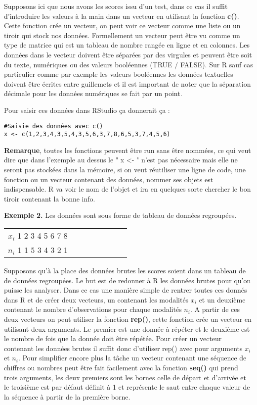 \documentclass{report}
\begin{document}
Supposons ici que nous avons les scores issu d'un test, dans ce cas il suffit d'introduire les valeurs à la main dans un vecteur en utilisant la fonction \textbf{c()}. Cette fonction crée un vecteur, on peut voir ce vecteur comme une liste ou un tiroir qui stock nos données. Formellement un vecteur peut être vu comme un type de matrice qui est un tableau de nombre rangée en ligne et en colonnes. Les données dans le vecteur doivent être séparées par des virgules et peuvent être soit du texte, numériques ou des valeurs booléennes (TRUE / FALSE). Sur R sauf cas particulier comme par exemple les valeurs booléennes les données textuelles doivent être écrites entre guillemets et il est important de noter que la séparation décimale pour les données numériques se fait par un point.

Pour saisir ces données dans RStudio ça donnerait ça :

\begin{verbatim}
#Saisie des données avec c()
x <- c(1,2,3,4,3,5,4,3,5,6,3,7,8,6,5,3,7,4,5,6)
\end{verbatim}

\textbf{Remarque}, toutes les fonctions peuvent être run sans être nommées, ce qui veut dire que dans l'exemple au dessus le " x <- " n'est pas nécessaire mais elle ne seront pas stockées dans la mémoire, si on veut réutiliser une ligne de code, une fonction ou un vecteur contenant des données, nommer ses objets est indispensable. R va voir le nom de l'objet et ira en quelques sorte chercher le bon tiroir contenant la bonne info.

\textbf{Exemple 2.} Les données sont sous forme de tableau de données regroupées.

\begin{center}
        \begin{tabular}{ c c c c c c c c}
            $x_i$ 1 2 3 4 5 6 7 8 \\
            $n_i$ 1 1 5 3 4 3 2 1 \\
        \end{tabular}
    \end{center}

Supposons qu'à la place des données brutes les scores soient dans un tableau de de données regroupées. Le but est de redonner à R les données brutes pour qu'on puisse les analyser. Dans ce cas une manière simple de rentrer toutes ces donnés dans R et de créer deux vecteurs, un contenant les modalités $x_i$ et un deuxième contenant le nombre d'observations pour chaque modalités $n_i$. A partir de ces deux vecteurs on peut utiliser la fonction \textbf{rep()}, cette fonction crée un vecteur en utilisant deux arguments. Le premier est une donnée à répéter et le deuxième est le nombre de fois que la donnée doit être répétée. Pour créer un vecteur contenant les données brutes il suffit donc d'utiliser rep() avec pour arguments $x_i$ et $n_i$. Pour simplifier encore plus la tâche un vecteur contenant une séquence de chiffres ou nombres peut être fait facilement avec la fonction \textbf{seq()} qui prend trois arguments, les deux premiers sont les bornes celle de départ et d'arrivée et le troisième est par défaut définit à 1 et représente le saut entre chaque valeur de la séquence à partir de la première borne.
\end{document}
